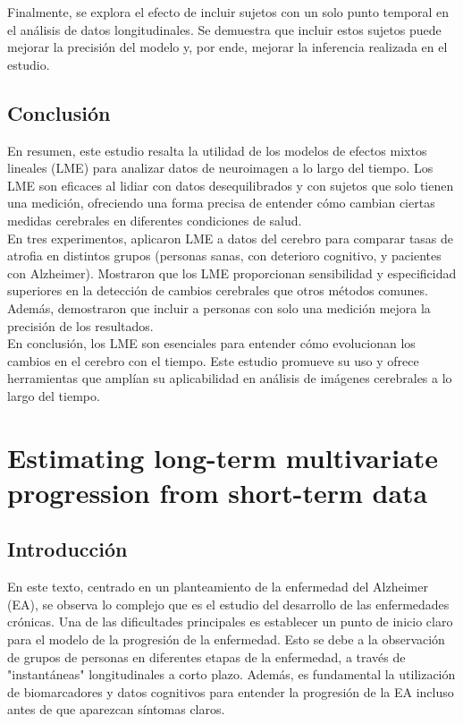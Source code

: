 	Finalmente, se explora el efecto de incluir sujetos con un solo punto temporal en el análisis de datos longitudinales. Se demuestra que incluir estos sujetos puede mejorar la precisión del modelo y, por ende, mejorar la inferencia realizada en el estudio.
	
	
	\subsection{Conclusión}
	En resumen, este estudio resalta la utilidad de los modelos de efectos mixtos lineales (LME) para analizar datos de neuroimagen a lo largo del tiempo. Los LME son eficaces al lidiar con datos desequilibrados y con sujetos que solo tienen una medición, ofreciendo una forma precisa de entender cómo cambian ciertas medidas cerebrales en diferentes condiciones de salud.\\
	
	En tres experimentos, aplicaron LME a datos del cerebro para comparar tasas de atrofia en distintos grupos (personas sanas, con deterioro cognitivo, y pacientes con Alzheimer). Mostraron que los LME proporcionan sensibilidad y especificidad superiores en la detección de cambios cerebrales que otros métodos comunes. Además, demostraron que incluir a personas con solo una medición mejora la precisión de los resultados.\\
	
	En conclusión, los LME son esenciales para entender cómo evolucionan los cambios en el cerebro con el tiempo. Este estudio promueve su uso y ofrece herramientas que amplían su aplicabilidad en análisis de imágenes cerebrales a lo largo del tiempo.\\
	
	
	
	
	
	\section{Estimating long-term multivariate progression from short-term data}
	
	
	\subsection{Introducción}
	En este texto, centrado en un planteamiento de la enfermedad del Alzheimer (EA), se observa lo complejo que es el estudio del desarrollo de las enfermedades crónicas. Una de las dificultades principales es establecer un punto de inicio claro para el modelo de la progresión de la enfermedad. Esto se debe a la observación de grupos de personas en diferentes etapas de la enfermedad,  a través de "instantáneas" longitudinales a corto plazo. Además, es fundamental la utilización de biomarcadores y datos cognitivos para entender la progresión de la EA incluso antes de que aparezcan síntomas claros.\\
	
